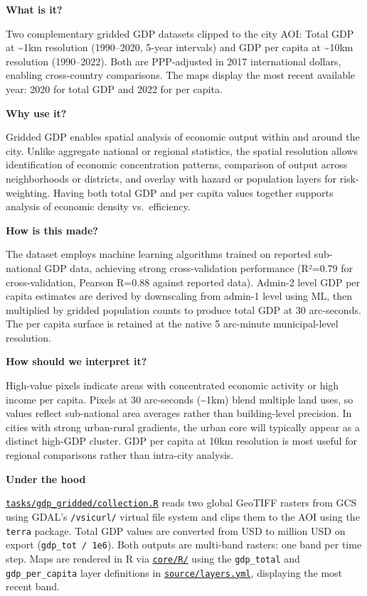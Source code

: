 \documentclass[
  letterpaper,
  DIV=11,
  numbers=noendperiod]{scrreprt}
\begin{document}
\textbf{What is it?}

Two complementary gridded GDP datasets clipped to the city AOI: Total
GDP at \textasciitilde1km resolution (1990--2020, 5-year intervals) and
GDP per capita at \textasciitilde10km resolution (1990--2022). Both are
PPP-adjusted in 2017 international dollars, enabling cross-country
comparisons. The maps display the most recent available year: 2020 for
total GDP and 2022 for per capita.

\textbf{Why use it?}

Gridded GDP enables spatial analysis of economic output within and
around the city. Unlike aggregate national or regional statistics, the
spatial resolution allows identification of economic concentration
patterns, comparison of output across neighborhoods or districts, and
overlay with hazard or population layers for risk-weighting. Having both
total GDP and per capita values together supports analysis of economic
density vs.~efficiency.

\textbf{How is this made?}

The dataset employs machine learning algorithms trained on reported
sub-national GDP data, achieving strong cross-validation performance
(R²=0.79 for cross-validation, Pearson R=0.88 against reported data).
Admin-2 level GDP per capita estimates are derived by downscaling from
admin-1 level using ML, then multiplied by gridded population counts to
produce total GDP at 30 arc-seconds. The per capita surface is retained
at the native 5 arc-minute municipal-level resolution.

\textbf{How should we interpret it?}

High-value pixels indicate areas with concentrated economic activity or
high income per capita. Pixels at 30 arc-seconds (\textasciitilde1km)
blend multiple land uses, so values reflect sub-national area averages
rather than building-level precision. In cities with strong urban-rural
gradients, the urban core will typically appear as a distinct high-GDP
cluster. GDP per capita at 10km resolution is most useful for regional
comparisons rather than intra-city analysis.

\textbf{Under the hood}

\href{../tasks/gdp_gridded/collection.R}{\texttt{tasks/gdp\_gridded/collection.R}}
reads two global GeoTIFF rasters from GCS using GDAL's
\texttt{/vsicurl/} virtual file system and clips them to the AOI using
the \texttt{terra} package. Total GDP values are converted from USD to
million USD on export (\texttt{gdp\_tot\ /\ 1e6}). Both outputs are
multi-band rasters: one band per time step. Maps are rendered in R via
\href{../core/R/}{\texttt{core/R/}} using the \texttt{gdp\_total} and
\texttt{gdp\_per\_capita} layer definitions in
\href{../source/layers.yml}{\texttt{source/layers.yml}}, displaying the
most recent band.
\end{document}
